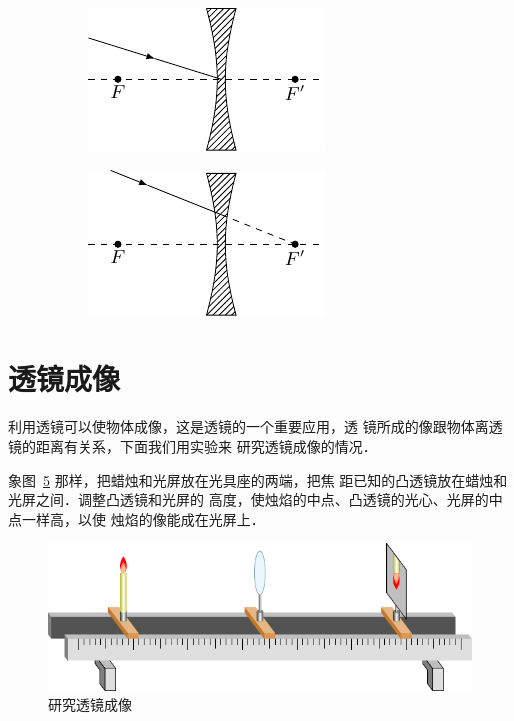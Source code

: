 \begin{figure}[htbp]
\begin{subfigure}{0.3\linewidth}
        \caption{}\label{fig_C_5-37c}
    \end{subfigure}
    \hfill
    \begin{subfigure}{0.3\linewidth}
        \centering
        \includegraphics{fig/C/5-37d.pdf}
        \caption{}\label{fig_C_5-37d}
    \end{subfigure}
    \hfill
    \begin{subfigure}{0.3\linewidth}
        \centering
        \includegraphics{fig/C/5-37e.pdf}
        \caption{}\label{fig_C_5-37e}
    \end{subfigure}
    \caption{}\label{fig_C_5-37}
\end{figure}

\section{透镜成像}
利用透镜可以使物体成像，这是透镜的一个重要应用，透
镜所成的像跟物体离透镜的距离有关系，下面我们用实验来
研究透镜成像的情况．

象图~\ref{fig_C_5-38} 那样，把蜡烛和光屏放在光具座的两端，把焦
距已知的凸透镜放在蜡烛和光屏之间．调整凸透镜和光屏的
高度，使烛焰的中点、凸透镜的光心、光屏的中点一样高，以使
烛焰的像能成在光屏上．
\begin{figure}[htbp]
    \centering
    \includegraphics{fig/C/5-38.pdf}
    \caption{研究透镜成像}\label{fig_C_5-38}
\end{figure}

